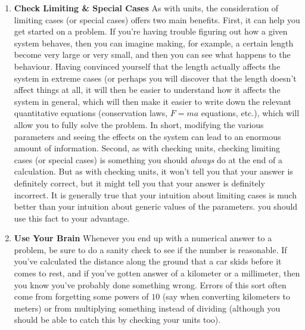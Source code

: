 \begin{enumerate}
    \item \textbf{Check Limiting \& Special Cases} As with units, the consideration of limiting cases (or special cases) offers two main benefits. First, it can help you get started on a problem. If you're having trouble figuring out how a given system behaves, then you can imagine making, for example, a certain length become very large or very small, and then you can see what happens to the behaviour. Having convinced yourself that the length actually affects the system in extreme cases (or perhaps you will discover that the length doesn't affect things at all, it will then be easier to understand how it affects the system in general, which will then make it easier to write down the relevant quantitative equations (conservation laws, \(F=ma\) equations, etc.), which will allow you to fully solve the problem. In short, modifying the various parameters and seeing the effects on the system can lead to an enormous amount of information. Second, as with checking units, checking limiting cases (or special cases) is something you should \textit{always} do at the end of a calculation. But as with checking units, it won't tell you that your answer is definitely correct, but it might tell you that your answer is definitely incorrect. It is generally true that your intuition about limiting cases is much better than your intuition about generic values of the parameters. you should use this fact to your advantage.
    \item \textbf{Use Your Brain} Whenever you end up with a numerical answer to a problem, be sure to do a sanity check to see if the number is reasonable. If you've calculated the distance along the ground that a car skids before it comes to rest, and if you've gotten answer of a kilometer or a millimeter, then you know you've probably done something wrong. Errors of this sort often come from forgetting some powers of $10$ (say when converting kilometers to meters) or from multiplying something instead of dividing (although you should be able to catch this by checking your units too).
\end{enumerate}